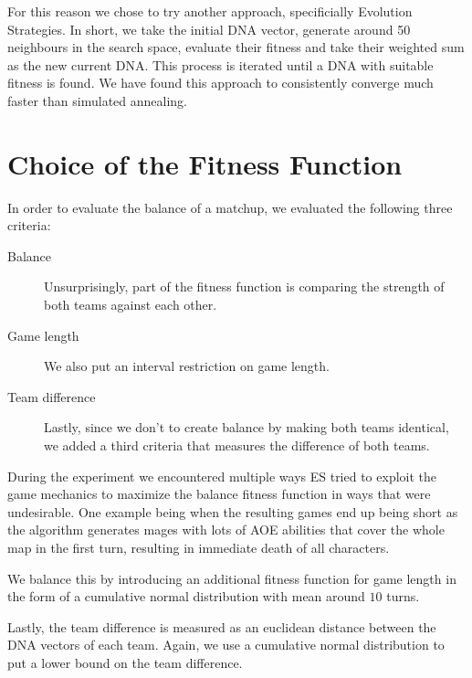 For this reason we chose to try another approach, specificially Evolution
Strategies. In short, we take the initial DNA vector, generate around 50
neighbours in the search space, evaluate their fitness and take their weighted
sum as the new current DNA\@. This process is iterated until a DNA with
suitable fitness is found. We have found this approach to consistently converge
much faster than simulated annealing.

\section{Choice of the Fitness Function}

In order to evaluate the balance of a matchup, we evaluated the following three
criteria:

\begin{description}
\item [Balance] Unsurprisingly, part of the fitness function is comparing the strength of both teams against each other.
\item [Game length] We also put an interval restriction on game length.
\item [Team difference] Lastly, since we don't to create balance by making both teams identical, we added a third criteria
that measures the difference of both teams.
\end{description}

During the experiment we encountered multiple ways ES tried to exploit the
game mechanics to maximize the balance fitness function in ways that were
undesirable. One example being when the resulting games end up being short
as the algorithm generates mages with lots of AOE abilities that cover the
whole map in the first turn, resulting in immediate death of all characters.

We balance this by introducing an additional fitness function for game length
in the form of a cumulative normal distribution with mean around $10$ turns.

Lastly, the team difference is measured as an euclidean distance between the DNA
vectors of each team. Again, we use a cumulative normal distribution to put a lower
bound on the team difference.
